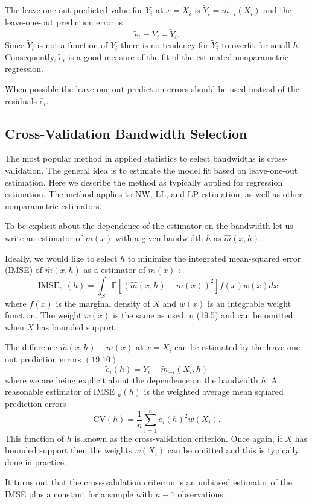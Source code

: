 \documentclass[10pt]{article}
\begin{document}
The leave-one-out predicted value for $Y_{i}$ at $x=X_{i}$ is $\widetilde{Y}_{i}=\widetilde{m}_{-i}\left(X_{i}\right)$ and the leave-one-out prediction error is
$$
\widetilde{e}_{i}=Y_{i}-\widetilde{Y}_{i} .
$$
Since $\widetilde{Y}_{i}$ is not a function of $Y_{i}$ there is no tendency for $\widetilde{Y}_{i}$ to overfit for small $h$. Consequently, $\widetilde{e}_{i}$ is a good measure of the fit of the estimated nonparametric regression.

When possible the leave-one-out prediction errors should be used instead of the residuals $\widehat{e}_{i}$.

\subsection{Cross-Validation Bandwidth Selection}
The most popular method in applied statistics to select bandwidths is cross-validation. The general idea is to estimate the model fit based on leave-one-out estimation. Here we describe the method as typically applied for regression estimation. The method applies to NW, LL, and LP estimation, as well as other nonparametric estimators.

To be explicit about the dependence of the estimator on the bandwidth let us write an estimator of $m(x)$ with a given bandwidth $h$ as $\widehat{m}(x, h)$.

Ideally, we would like to select $h$ to minimize the integrated mean-squared error (IMSE) of $\widehat{m}(x, h)$ as a estimator of $m(x)$ :
$$
\operatorname{IMSE}_{n}(h)=\int_{S} \mathbb{E}\left[(\widehat{m}(x, h)-m(x))^{2}\right] f(x) w(x) d x
$$
where $f(x)$ is the marginal density of $X$ and $w(x)$ is an integrable weight function. The weight $w(x)$ is the same as used in (19.5) and can be omitted when $X$ has bounded support.

The difference $\widehat{m}(x, h)-m(x)$ at $x=X_{i}$ can be estimated by the leave-one-out prediction errors $(19.10)$
$$
\widetilde{e}_{i}(h)=Y_{i}-\widetilde{m}_{-i}\left(X_{i}, h\right)
$$
where we are being explicit about the dependence on the bandwidth $h$. A reasonable estimator of IMSE ${ }_{n}(h)$ is the weighted average mean squared prediction errors
$$
\mathrm{CV}(h)=\frac{1}{n} \sum_{i=1}^{n} \widetilde{e}_{i}(h)^{2} w\left(X_{i}\right) .
$$
This function of $h$ is known as the cross-validation criterion. Once again, if $X$ has bounded support then the weights $w\left(X_{i}\right)$ can be omitted and this is typically done in practice.

It turns out that the cross-validation criterion is an unbiased estimator of the IMSE plus a constant for a sample with $n-1$ observations.
\end{document}
